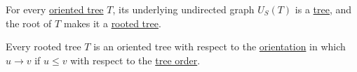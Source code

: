 \begin{proposition}\label{thm:oriented_and_rooted_trees}
  \hfill
  \begin{thmenum}
     For every \hyperref[def:oriented_tree]{oriented tree} \( T \), its underlying undirected graph \hyperref[def:graph_functors/simple_forgetful]{\( U_S \)}\( (T) \) is a \hyperref[def:tree]{tree}, and the root of \( T \) makes it a \hyperref[def:rooted_tree]{rooted tree}.

     Every rooted tree \( T \) is an oriented tree with respect to the \hyperref[def:multigraph_orientation]{orientation} in which \( u \to v \) if \( u \leq v \) with respect to the \hyperref[def:rooted_tree/order]{tree order}.
  \end{thmenum}
\end{proposition}
